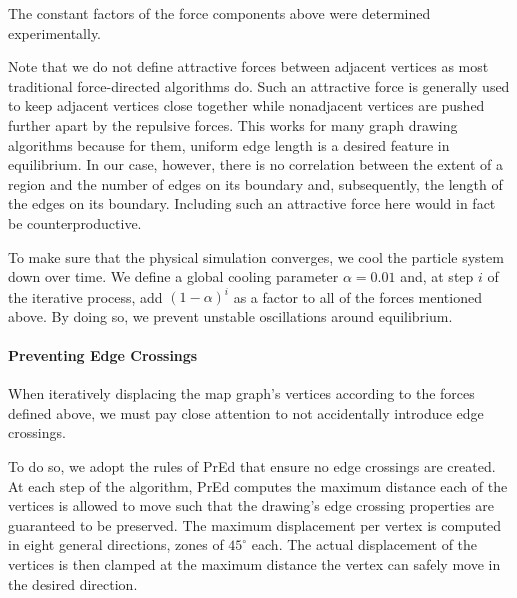 The constant factors of the force components above were determined experimentally.

Note that we do not define attractive forces between adjacent vertices as most traditional force-directed algorithms do.
Such an attractive force is generally used to keep adjacent vertices close together while nonadjacent vertices are pushed further apart by the repulsive forces.
This works for many graph drawing algorithms because for them, uniform edge length is a desired feature in equilibrium.
In our case, however, there is no correlation between the extent of a region and the number of edges on its boundary and, subsequently, the length of the edges on its boundary.
Including such an attractive force here would in fact be counterproductive.

To make sure that the physical simulation converges, we cool the particle system down over time.
We define a global cooling parameter $\alpha = 0.01$ and, at step $i$ of the iterative process, add $(1 - \alpha)^i$ as a factor to all of the forces mentioned above.
By doing so, we prevent unstable oscillations around equilibrium.



\paragraph{Preventing Edge Crossings}

When iteratively displacing the map graph's vertices according to the forces defined above, we must pay close attention to not accidentally introduce edge crossings.

To do so, we adopt the rules of PrEd \cite{bertault1999force} that ensure no edge crossings are created.
At each step of the algorithm, PrEd computes the maximum distance each of the vertices is allowed to move such that the drawing's edge crossing properties are guaranteed to be preserved.
The maximum displacement per vertex is computed in eight general directions, zones of $45^\circ$ each.
The actual displacement of the vertices is then clamped at the maximum distance the vertex can safely move in the desired direction.
